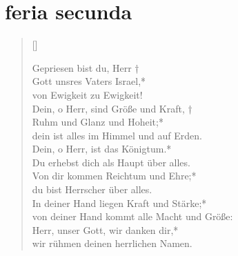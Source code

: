 \section{feria secunda}



\begin{verse}[\versewidth]

Gepriesen bist du, Herr †\\
Gott unsres Vaters Israel,*\\
von Ewigkeit zu Ewigkeit!\\
\vin Dein, o Herr, sind Größe und Kraft, †\\
\vin Ruhm und Glanz und Hoheit;*\\
dein ist alles im Himmel und auf Erden.\\
\vin Dein, o Herr, ist das Königtum.*\\
\vin Du erhebst dich als Haupt über alles.\\
Von dir kommen Reichtum und Ehre;*\\
du bist Herrscher über alles.\\
\vin In deiner Hand liegen Kraft und Stärke;*\\
\vin von deiner Hand kommt alle Macht und Größe:\\
Herr, unser Gott, wir danken dir,*\\
wir rühmen deinen herrlichen Namen.\\
 
\end{verse}

\vspace{0.6cm}




